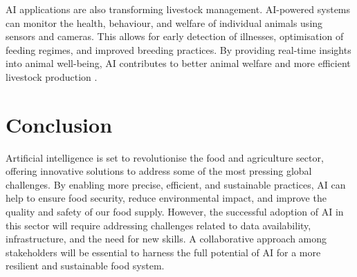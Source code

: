 AI applications are also transforming livestock management. AI-powered systems can monitor the health, behaviour, and welfare of individual animals using sensors and cameras. This allows for early detection of illnesses, optimisation of feeding regimes, and improved breeding practices. By providing real-time insights into animal well-being, AI contributes to better animal welfare and more efficient livestock production \parencite{kumar2025reviewai}.

\section{Conclusion}

Artificial intelligence is set to revolutionise the food and agriculture sector, offering innovative solutions to address some of the most pressing global challenges. By enabling more precise, efficient, and sustainable practices, AI can help to ensure food security, reduce environmental impact, and improve the quality and safety of our food supply. However, the successful adoption of AI in this sector will require addressing challenges related to data availability, infrastructure, and the need for new skills. A collaborative approach among stakeholders will be essential to harness the full potential of AI for a more resilient and sustainable food system.